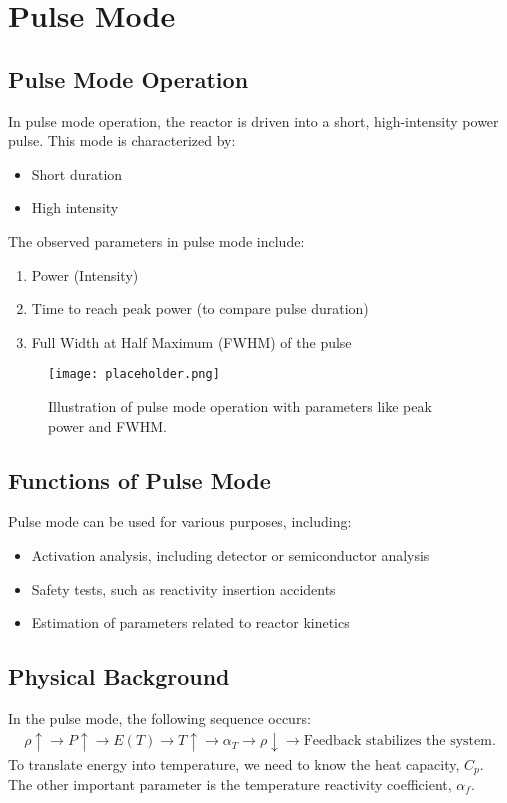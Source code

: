 \chapter{Pulse Mode}

\section{Pulse Mode Operation}
In pulse mode operation, the reactor is driven into a short, high-intensity power pulse. This mode is characterized by:
\begin{itemize}
    \item Short duration
    \item High intensity
\end{itemize}
The observed parameters in pulse mode include:
\begin{enumerate}
    \item Power (Intensity)
    \item Time to reach peak power (to compare pulse duration)
    \item Full Width at Half Maximum (FWHM) of the pulse
\end{enumerate}

\begin{figure}[h]
    \centering
    \texttt{[image: placeholder.png]}
    \caption{Illustration of pulse mode operation with parameters like peak power and FWHM.}
    \label{fig:pulse_mode}
\end{figure}

\section{Functions of Pulse Mode}
Pulse mode can be used for various purposes, including:
\begin{itemize}
    \item Activation analysis, including detector or semiconductor analysis
    \item Safety tests, such as reactivity insertion accidents
    \item Estimation of parameters related to reactor kinetics
\end{itemize}

\section{Physical Background}
In the pulse mode, the following sequence occurs:
\begin{align*}
    \rho \uparrow \to P \uparrow \to E(T) \to T \uparrow \to \alpha_T \to \rho \downarrow \to \text{Feedback stabilizes the system.}
\end{align*}
To translate energy into temperature, we need to know the heat capacity, $C_p$. The other important parameter is the temperature reactivity coefficient, $\alpha_f$.


